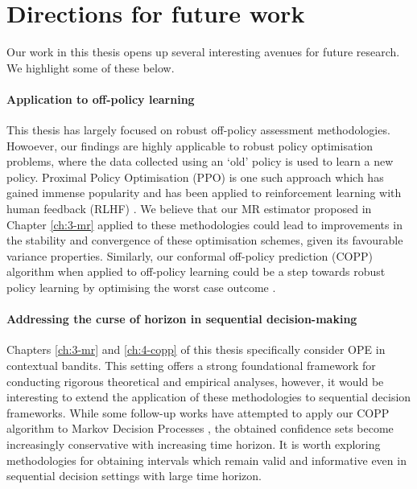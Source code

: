 \section{Directions for future work}
Our work in this thesis opens up several interesting avenues for future research. We highlight some of these below.

\paragraph*{Application to off-policy learning}
This thesis has largely focused on robust off-policy assessment methodologies. Howoever, our findings are highly applicable to robust policy optimisation problems, where the data collected using an `old’ policy is used to learn a new policy. 
Proximal Policy Optimisation (PPO) \cite{schulman2017proximal} is one such approach which has gained immense popularity and has been applied to reinforcement learning with human feedback (RLHF) \citep{lambert2022illustrating}. 
We believe that our MR estimator proposed in Chapter \ref*{ch:3-mr} applied to these methodologies could lead to improvements in the stability and convergence
of these optimisation schemes, given its favourable variance properties. 
Similarly, our conformal off-policy prediction (COPP) algorithm when applied to off-policy learning could be a
step towards robust policy learning by optimising the worst case outcome \citep{stutz2021learning}.

\paragraph*{Addressing the curse of horizon in sequential decision-making}
Chapters \ref*{ch:3-mr} and \ref*{ch:4-copp} of this thesis specifically consider OPE in contextual bandits. 
This setting offers a strong foundational framework for conducting rigorous theoretical and empirical analyses, 
however, it would be interesting to extend the application of these methodologies to sequential decision frameworks.
While some follow-up works have attempted to apply our COPP algorithm to Markov Decision Processes \citep{foffano2023conformal, zhang2023conformal, kuipers2024conformal}, the obtained confidence sets become increasingly conservative with increasing time horizon. 
It is worth exploring methodologies for obtaining intervals which remain valid and informative even in sequential decision settings with large time horizon.  


